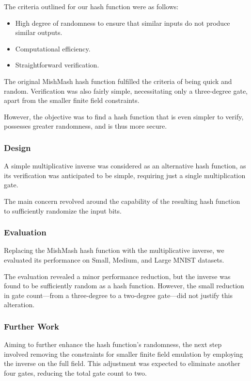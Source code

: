 \documentclass{article}[12pt]
\begin{document}
The criteria outlined for our hash function were as follows:

\begin{itemize}
    \item High degree of randomness to ensure that similar inputs do not produce similar outputs.
    \item Computational efficiency.
    \item Straightforward verification.
\end{itemize}

The original MishMash hash function fulfilled the criteria of being quick and random.
Verification was also fairly simple, necessitating only a three-degree gate, apart from the smaller finite field constraints.

However, the objective was to find a hash function that is even simpler to verify, possesses greater randomness, and is thus more secure.

\subsubsection{Design}\label{subsubsec:design}

A simple multiplicative inverse was considered as an alternative hash function, as its verification was anticipated to be simple, requiring just a single multiplication gate.

The main concern revolved around the capability of the resulting hash function to sufficiently randomize the input bits.

\subsubsection{Evaluation}\label{subsubsec:evaluation}

Replacing the MishMash hash function with the multiplicative inverse, we evaluated its performance on Small, Medium, and Large MNIST datasets.

The evaluation revealed a minor performance reduction, but the inverse was found to be sufficiently random as a hash function.
However, the small reduction in gate count—from a three-degree to a two-degree gate—did not justify this alteration.

\subsubsection{Further Work}\label{subsubsec:further-work}

Aiming to further enhance the hash function's randomness, the next step involved removing the constraints for smaller finite field emulation by employing the inverse on the full field.
This adjustment was expected to eliminate another four gates, reducing the total gate count to two.
\end{document}
